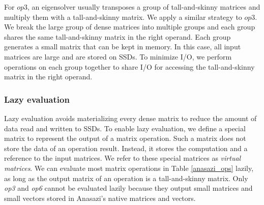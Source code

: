 For $op3$, an eigensolver usually transposes a group of tall-and-skinny matrices
and multiply them with a tall-and-skinny matrix. We apply a similar strategy to
$op3$. We break the large group of dense matrices into multiple groups and each
group shares the same tall-and-skinny matrix in the right operand. Each group
generates
a small matrix that can be kept in memory. In this case, all input matrices
are large and are stored on SSDs. To minimize I/O, we perform operations on
each group together to share I/O for accessing the tall-and-skinny matrix
in the right operand.


\subsubsection{Lazy evaluation} \label{sec:lazy_eval}
Lazy evaluation avoids materializing every dense matrix to reduce the amount
of data read and written to SSDs.
To enable lazy evaluation, we define a special matrix to represent the output
of a matrix operation. Such a matrix does not store the data of
an operation result. Instead, it stores the computation and a reference to
the input matrices. We refer to these special matrices as \textit{virtual matrices}.
We can evaluate most matrix operations in Table \ref{anasazi_ops} lazily,
as long as the output matrix of an operation is a tall-and-skinny matrix. Only \textit{op3}
and \textit{op6} cannot be evaluated lazily because they output small matrices
and small vectors stored in Anasazi's native matrices and vectors.



